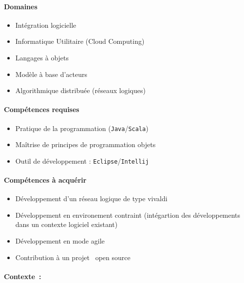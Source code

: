 \documentclass[a4paper,11pt]{article}
\newcommand{\eclipse}{\texttt{Eclipse}}
\newcommand{\intellij}{\texttt{Intellij}}
\newcommand{\java}{\texttt{Java}\xspace}
\newcommand{\scala}{\texttt{Scala}\xspace}
\begin{document}
\begin{note}


\paragraph*{Domaines}

\begin{itemize}
 \item Intégration logicielle
 \item Informatique Utilitaire (Cloud Computing)
 \item Langages à objets
 \item Modèle à base d'acteurs
 \item Algorithmique distribuée (réseaux logiques)
 \end{itemize}

\paragraph*{Compétences requises}

\begin{itemize}
 \item Pratique de la programmation (\java/\scala)
 \item Maîtrise de principes de programmation objets
 \item Outil de développement : \eclipse/\intellij
\end{itemize}

\paragraph*{Compétences à acquérir}

\begin{itemize}
 \item Développement d'un réseau logique de type vivaldi
 \item Développement en environement contraint (intégartion des développements dans un contexte logiciel existant)
 \item Développement en mode agile
 \item Contribution à un projet \og~open source~\fg
\end{itemize}

\paragraph*{Contexte~:\\}


\end{note}
\end{document}
